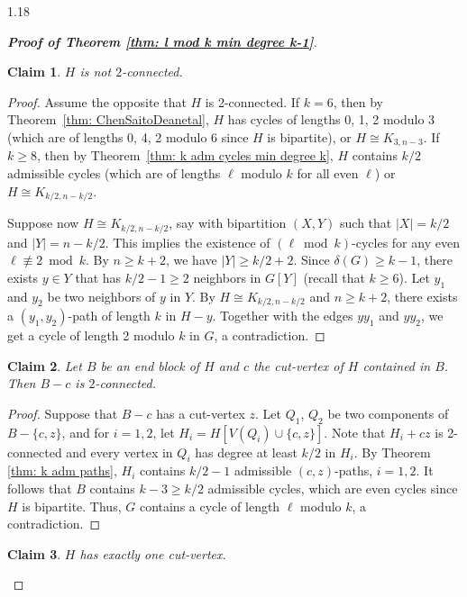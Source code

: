 \documentclass[10pt]{article}
\newtheorem{claim}{Claim}
\begin{document}
\begin{spacing}{1.18}
\begin{proof}[\bf Proof of Theorem \ref{thm: l mod k min degree k-1}]
\setcounter{claim}{0}
\begin{claim}\label{claim: HNot2Connected}
    $H$ is not $2$-connected.    
\end{claim}

\begin{proof}
    Assume the opposite that $H$ is 2-connected. If $k=6$, then by Theorem~\ref{thm: ChenSaitoDeanetal}, $H$ has cycles of lengths 0, 1, 2 modulo 3 (which are of lengths 0, 4, 2 modulo 6 since $H$ is bipartite), or $H\cong K_{3,n-3}$. If $k\geqslant 8$, then by Theorem~\ref{thm: k adm cycles min degree k}, $H$ contains $k/2$ admissible cycles (which are of lengths $\ell$ modulo $k$ for all even $\ell$) or $H\cong K_{k/2,n-k/2}$. 
    
    Suppose now $H\cong K_{k/2,n-k/2}$, say with bipartition $(X,Y)$ such that $|X|=k/2$ and $|Y|=n-k/2$. This implies the existence of $(\ell\bmod k)$-cycles for any even $\ell\not\equiv 2\bmod k$. By $n\geqslant k+2$, we have $|Y|\geqslant k/2+2$. Since $\delta(G)\geqslant k-1$, there exists $y\in Y$ that has $k/2-1\geqslant 2$ neighbors in $G[Y]$ (recall that $k\geqslant 6$). Let $y_1$ and $y_2$ be two neighbors of $y$ in $Y$. By $H\cong K_{k/2,n-k/2}$ and $n\geqslant k+2$, there exists a $(y_1,y_2)$-path of length $k$ in $H-y$. Together with the edges $yy_1$ and $yy_2$, we get a cycle of length 2 modulo $k$ in $G$, a contradiction. 
\end{proof}

\begin{claim}\label{claim: B-z2connected}
    Let $B$ be an end block of $H$ and $c$ the cut-vertex of $H$ contained in $B$. Then $B-c$ is $2$-connected.
\end{claim}

\begin{proof}
    Suppose that $B-c$ has a cut-vertex $z$. Let $Q_1$, $Q_2$ be two components of $B-\{c,z\}$, and for $i=1,2$, let $H_i=H[V(Q_i)\cup\{c,z\}]$. Note that $H_i+cz$ is 2-connected and every vertex in $Q_i$ has degree at least $k/2$ in $H_i$. By Theorem \ref{thm: k adm paths}, $H_i$ contains $k/2-1$ admissible $(c,z)$-paths, $i=1,2$. It follows that $B$ contains $k-3\geqslant k/2$ admissible cycles, which are even cycles since $H$ is bipartite. Thus, $G$ contains a cycle of length $\ell$ modulo $k$, a contradiction.
\end{proof}

\begin{claim}\label{claim: OneCutVertex}
    $H$ has exactly one cut-vertex.
\end{claim}


\end{proof}
\end{spacing}
\end{document}
